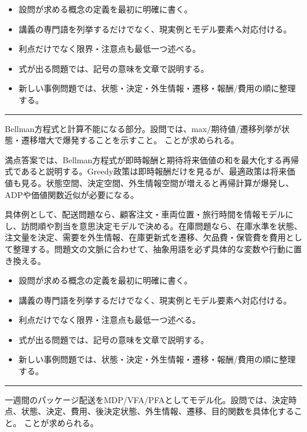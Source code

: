 \begin{itemize}
\item 設問が求める概念の定義を最初に明確に書く。
\item 講義の専門語を列挙するだけでなく、現実例とモデル要素へ対応付ける。
\item 利点だけでなく限界・注意点も最低一つ述べる。
\item 式が出る問題では、記号の意味を文章で説明する。
\item 新しい事例問題では、状態・決定・外生情報・遷移・報酬/費用の順に整理する。
\end{itemize}
\vspace{2mm}\hrule\vspace{2mm}
Bellman方程式と計算不能になる部分。設問では、max/期待値/遷移列挙が状態・遷移増大で爆発することを示すこと。 ことが求められる。\par
{}
満点答案では、Bellman方程式が即時報酬と期待将来価値の和を最大化する再帰式であると説明する。Greedy政策は即時報酬だけを見るが、最適政策は将来価値も見る。状態空間、決定空間、外生情報空間が増えると再帰計算が爆発し、ADPや価値関数近似が必要になる。\par
{}
具体例として、配送問題なら、顧客注文・車両位置・旅行時間を情報モデルにし、訪問順や割当を意思決定モデルで決める。在庫問題なら、在庫水準を状態、注文量を決定、需要を外生情報、在庫更新式を遷移、欠品費・保管費を費用として整理する。問題文の文脈に合わせて、抽象用語を必ず具体的な変数や行動に置き換える。\par
{}
\begin{itemize}
\item 設問が求める概念の定義を最初に明確に書く。
\item 講義の専門語を列挙するだけでなく、現実例とモデル要素へ対応付ける。
\item 利点だけでなく限界・注意点も最低一つ述べる。
\item 式が出る問題では、記号の意味を文章で説明する。
\item 新しい事例問題では、状態・決定・外生情報・遷移・報酬/費用の順に整理する。
\end{itemize}
\vspace{2mm}\hrule\vspace{2mm}
一週間のパッケージ配送をMDP/VFA/PFAとしてモデル化。設問では、決定時点、状態、決定、費用、後決定状態、外生情報、遷移、目的関数を具体化すること。 ことが求められる。\par
